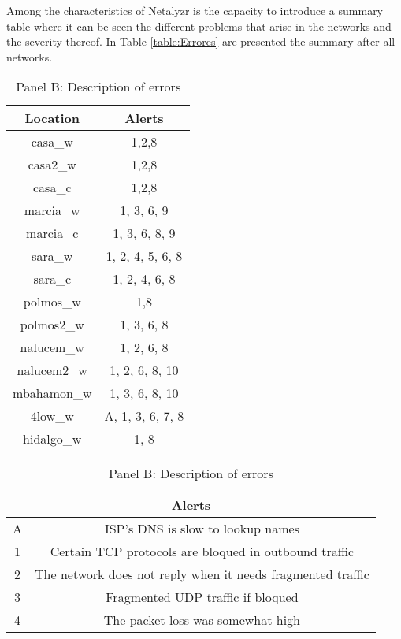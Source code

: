 Among the characteristics of Netalyzr is the capacity to introduce a summary
table where it can be seen the different problems that arise in the networks
and the severity thereof. In Table \ref{table:Errores} are presented the
summary after all networks.

\begin{table}
    \begin{subtable}{\linewidth}
    \centering
    \caption*{Panel A: Summary or errors}
    \begin{tabular}{|c||c|}
 \hline
Location		& Alerts            \\ \hline \hline
casa\_w			& 1,2,8             \\ \hline
casa2\_w		& 1,2,8             \\ \hline
casa\_c			& 1,2,8 			\\ \hline
marcia\_w		& 1, 3, 6, 9 		\\ \hline
marcia\_c		& 1, 3, 6, 8, 9 	\\ \hline
sara\_w			& 1, 2, 4, 5, 6, 8 	\\ \hline
sara\_c			& 1, 2, 4, 6, 8 	\\ \hline
polmos\_w		& 1,8 				\\ \hline
polmos2\_w		& 1, 3, 6, 8 		\\ \hline
nalucem\_w		& 1, 2, 6, 8 		\\ \hline
nalucem2\_w		& 1, 2, 6, 8, 10 	\\ \hline
mbahamon\_w		& 1, 3, 6, 8, 10 	\\ \hline
4low\_w			& A, 1, 3, 6, 7, 8 	\\ \hline
hidalgo\_w		& 1, 8 				\\ \hline
    \end{tabular}
    \end{subtable}
\bigskip
    \begin{subtable}{\linewidth}
    \centering
    \caption*{Panel B: Description of errors}
    \begin{tabular}{|c||c|}
 \hline
 \multicolumn{2}{|c|}{Alerts} \\ \hline \hline
A	& ISP's DNS is slow to lookup names								\\ \hline
1	& Certain TCP protocols are bloqued in outbound traffic 		\\ \hline
2	& The network does not reply when it needs fragmented traffic 	\\ \hline
3	& Fragmented UDP traffic if bloqued 							\\ \hline
4	& The packet loss was somewhat high 							\\ \hline

\end{tabular}
\end{subtable}
\end{table}
